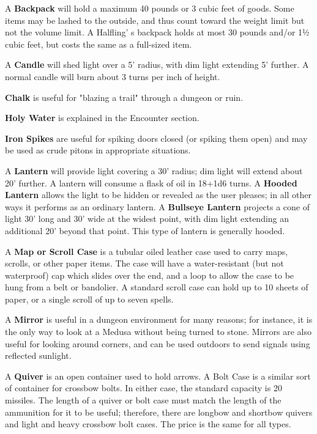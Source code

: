 \documentclass[a4paper,twoside,openany,10pt]{book}
\begin{document}
\begin{multicols}{2}


A \textbf{Backpack }will hold a maximum 40 pounds or 3 cubic feet of goods. Some items may be lashed to the outside, and thus count toward the weight limit but not the volume limit. A Halfling' s backpack holds at most 30 pounds and/or 1½ cubic feet, but costs the same as a full-sized item.\smallskip

A \textbf{Candle} will shed light over a 5'{} radius, with dim light extending 5'{} further. A normal candle will burn about 3 turns per inch of height.\smallskip

\textbf{Chalk} is useful for "blazing a trail" through a dungeon or ruin.\smallskip

\textbf{Holy Water} is explained in the Encounter section.\smallskip

\textbf{Iron Spikes} are useful for spiking doors closed (or spiking them open) and may be used as crude pitons in appropriate situations.\smallskip

A \textbf{Lantern} will provide light covering a 30'{} radius; dim light will extend about 20'{} further. A lantern will consume a flask of oil in 18+1d6 turns. A \textbf{Hooded Lantern} allows the light to be hidden or revealed as the user pleases; in all other ways it performs as an ordinary lantern. A \textbf{Bullseye Lantern} projects a cone of light 30'{} long and 30'{} wide at the widest point, with dim light extending an additional 20'{} beyond that point. This type of lantern is generally hooded.\smallskip

A \textbf{Map or Scroll Case} is a tubular oiled leather case used to carry maps, scrolls, or other paper items. The case will have a water-resistant (but not waterproof) cap which slides over the end, and a loop to allow the case to be hung from a belt or bandolier. A standard scroll case can hold up to 10 sheets of paper, or a single scroll of up to seven spells.\smallskip

A \textbf{Mirror} is useful in a dungeon environment for many reasons; for instance, it is the only way to look at a Medusa without being turned to stone. Mirrors are also useful for looking around corners, and can be used outdoors to send signals using reflected sunlight.\smallskip

A \textbf{Quiver} is an open container used to hold arrows. A Bolt Case is a similar sort of container for crossbow bolts. In either case, the standard capacity is 20 missiles. The length of a quiver or bolt case must match the length of the ammunition for it to be useful; therefore, there are longbow and shortbow quivers and light and heavy crossbow bolt cases. The price is the same for all types.\smallskip


\end{multicols}
\end{document}
